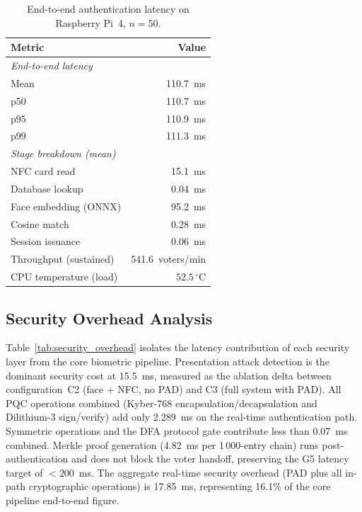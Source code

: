 \documentclass[pdflatex,sn-vancouver-num]{sn-jnl}%
\theoremstyle{thmstyleone}%
\theoremstyle{thmstyletwo}%
\theoremstyle{thmstylethree}%
\begin{document}
\begin{table}[t]
\caption{End-to-end authentication latency on Raspberry Pi~4, \(n{=}50\).}
\label{tab:pi}%
\begin{tabular}{|l|r|}
  \hline
  Metric & Value \\
  \hline
  \multicolumn{2}{|l|}{\textit{End-to-end latency}} \\
  \quad Mean & 110.7~ms \\
  \quad p50  & 110.7~ms \\
  \quad p95  & 110.9~ms \\
  \quad p99  & 111.3~ms \\
  \hline
  \multicolumn{2}{|l|}{\textit{Stage breakdown (mean)}} \\
  \quad NFC card read         & 15.1~ms \\
  \quad Database lookup       & 0.04~ms \\
  \quad Face embedding (ONNX) & 95.2~ms \\
  \quad Cosine match          & 0.28~ms \\
  \quad Session issuance      & 0.06~ms \\
  \hline
  Throughput (sustained) & 541.6~voters/min \\
  CPU temperature (load) & \(52.5\,^\circ\)C \\
  \hline
\end{tabular}
\end{table}

\subsection{Security Overhead Analysis}\label{sec:security_overhead}

Table~\ref{tab:security_overhead} isolates the latency contribution of each
security layer from the core biometric pipeline. Presentation attack detection
is the dominant security cost at 15.5~ms, measured as the ablation delta
between configuration~C2 (face + NFC, no PAD) and C3 (full system with PAD).
All PQC operations combined (Kyber-768 encapsulation/decapsulation and
Dilithium-3 sign/verify) add only 2.289~ms on the real-time authentication
path. Symmetric operations and the DFA protocol gate contribute less than
0.07~ms combined. Merkle proof generation (4.82~ms per 1\,000-entry chain)
runs post-authentication and does not block the voter handoff, preserving the
G5 latency target of \(<200\)~ms. The aggregate real-time security overhead
(PAD plus all in-path cryptographic operations) is 17.85~ms, representing
16.1\% of the core pipeline end-to-end figure.
\end{document}
